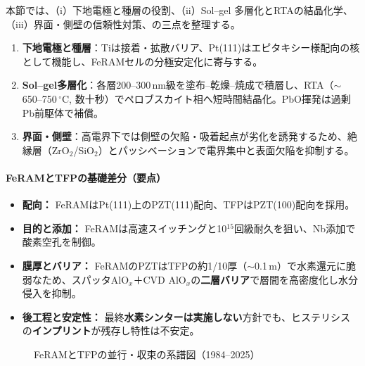 \documentclass[conference]{IEEEtran}
\begin{document}
本節では、（i）下地電極と種層の役割、（ii）Sol--gel 多層化とRTAの結晶化学、（iii）界面・側壁の信頼性対策、の三点を整理する。
\begin{enumerate}
  \item \textbf{下地電極と種層}：Tiは接着・拡散バリア、Pt(111)はエピタキシー様配向の核として機能し、FeRAMセルの分極安定化に寄与する。
  \item \textbf{Sol--gel多層化}：各層200--300\,nm級を塗布–乾燥–焼成で積層し、RTA（$\sim$650--750\,$^\circ$C, 数十秒）でペロブスカイト相へ短時間結晶化。PbO揮発は過剰Pb前駆体で補償。
  \item \textbf{界面・側壁}：高電界下では側壁の欠陥・吸着起点が劣化を誘発するため、絶縁層（ZrO$_2$/SiO$_2$）とパッシベーションで電界集中と表面欠陥を抑制する。
\end{enumerate}

\paragraph{FeRAMとTFPの基礎差分（要点）}
\begin{itemize}
  \item \textbf{配向：} FeRAMはPt(111)上のPZT(111)配向、TFPはPZT(100)配向を採用。
  \item \textbf{目的と添加：} FeRAMは高速スイッチングと10$^{15}$回級耐久を狙い、Nb添加で酸素空孔を制御。
  \item \textbf{膜厚とバリア：} FeRAMのPZTはTFPの約1/10厚（$\sim$0.1\,\textmu m）で水素還元に脆弱なため、スパッタAlO$_x$＋CVD AlO$_x$の\textbf{二層バリア}で層間を高密度化し水分侵入を抑制。
  \item \textbf{後工程と安定性：} 最終\textbf{水素シンターは実施しない}方針でも、ヒステリシスの\textbf{インプリント}が残存し特性は不安定。
\end{itemize}

\begin{figure}[!t]
\centering
{}
\caption{FeRAMとTFPの並行・収束の系譜図（1984–2025）}
\label{fig:timeline}
\end{figure}
\end{document}

